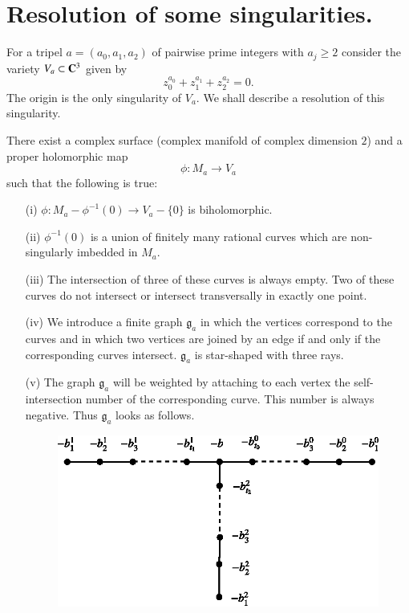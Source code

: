 \section{Resolution of some singularities.}\label{art11-sec4}

For a tripel $a=(a_{0},a_{1},a_{2})$ of pairwise prime integers with $a_{j}\geq 2$ consider the variety $V_{a}\subset \mathbf{C}^{3}$ given by
\begin{equation*}
z^{a_{0}}_{0}+z^{a_{1}}_{1}+z^{a_{2}}_{2}=0.\tag{1}\label{art11-sec4-eq1}
\end{equation*}\pageoriginale
The origin is the only singularity of $V_{a}$. We shall describe a resolution of this singularity.

\begin{theorem*}
There exist a complex surface (complex manifold of complex dimension $2$) and a proper holomorphic map
$$
\phi : M_{a}\to V_{a}
$$
such that the following is true:
\begin{itemize}
\item[\rm(i)] $\phi : M_{a}-\phi^{-1}(0)\to V_{a}-\{0\}$ is biholomorphic.

\item[\rm(ii)] $\phi^{-1}(0)$ is a union of finitely many rational curves which are non-singularly imbedded in $M_{a}$.

\item[\rm(iii)] The intersection of three of these curves is always empty. Two of these curves do not intersect or intersect transversally in exactly one point.

\item[\rm(iv)] We introduce a finite graph $\mathfrak{g}_{a}$ in which the vertices correspond to the curves and in which two vertices are joined by an edge if and only if the corresponding curves intersect. $\mathfrak{g}_{a}$ is star-shaped with three rays.

\item[\rm(v)] The graph $\mathfrak{g}_{a}$ will be weighted by attaching to each vertex the self-intersection number of the corresponding curve. This number is always negative. Thus $\mathfrak{g}_{a}$ looks as follows.
\begin{figure}[H]
\centering
\includegraphics{src/chap11/fig9.eps}
\end{figure}


\end{itemize}
\end{theorem*}
